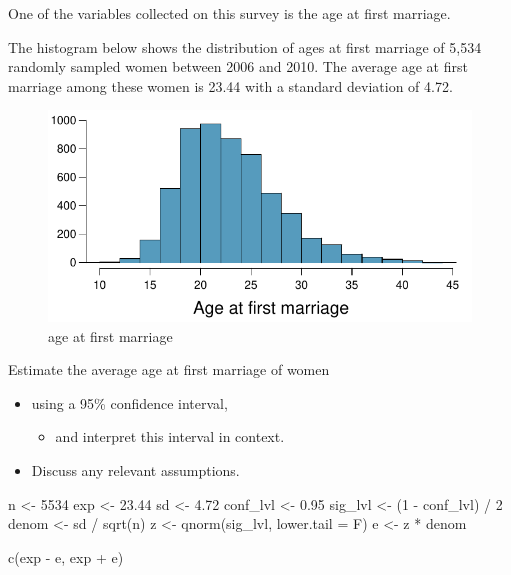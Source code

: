 \documentclass[
]{article}
\newenvironment{Shaded}{\begin{snugshade}}{\end{snugshade}}
\newcommand{\AttributeTok}[1]{\textcolor[rgb]{0.77,0.63,0.00}{#1}}
\newcommand{\DecValTok}[1]{\textcolor[rgb]{0.00,0.00,0.81}{#1}}
\newcommand{\FloatTok}[1]{\textcolor[rgb]{0.00,0.00,0.81}{#1}}
\newcommand{\FunctionTok}[1]{\textcolor[rgb]{0.00,0.00,0.00}{#1}}
\newcommand{\NormalTok}[1]{#1}
\newcommand{\OtherTok}[1]{\textcolor[rgb]{0.56,0.35,0.01}{#1}}
\newcommand{\SpecialCharTok}[1]{\textcolor[rgb]{0.00,0.00,0.00}{#1}}
\providecommand{\tightlist}{%
  \setlength{\itemsep}{0pt}\setlength{\parskip}{0pt}}
\begin{document}
One of the variables collected on this survey is the age at first
marriage.

The histogram below shows the distribution of ages at first marriage of
5,534 randomly sampled women between 2006 and 2010. The average age at
first marriage among these women is 23.44 with a standard deviation of
4.72.

\begin{figure}
\centering
\includegraphics{./figs/marriage.png}
\caption{age at first marriage}
\end{figure}

Estimate the average age at first marriage of women

\begin{itemize}
\tightlist
\item
  using a 95\% confidence interval,

  \begin{itemize}
  \tightlist
  \item
    and interpret this interval in context.
  \end{itemize}
\item
  Discuss any relevant assumptions.
\end{itemize}

\begin{Shaded}
\begin{Highlighting}[]
\NormalTok{n }\OtherTok{\textless{}{-}} \DecValTok{5534}
\NormalTok{exp }\OtherTok{\textless{}{-}} \FloatTok{23.44}
\NormalTok{sd }\OtherTok{\textless{}{-}} \FloatTok{4.72}
\NormalTok{conf\_lvl }\OtherTok{\textless{}{-}} \FloatTok{0.95}
\NormalTok{sig\_lvl }\OtherTok{\textless{}{-}}\NormalTok{ (}\DecValTok{1} \SpecialCharTok{{-}}\NormalTok{ conf\_lvl) }\SpecialCharTok{/} \DecValTok{2}
\NormalTok{denom  }\OtherTok{\textless{}{-}}\NormalTok{ sd }\SpecialCharTok{/} \FunctionTok{sqrt}\NormalTok{(n)}
\NormalTok{z }\OtherTok{\textless{}{-}} \FunctionTok{qnorm}\NormalTok{(sig\_lvl, }\AttributeTok{lower.tail =}\NormalTok{ F)}
\NormalTok{e }\OtherTok{\textless{}{-}}\NormalTok{ z }\SpecialCharTok{*}\NormalTok{ denom}

\FunctionTok{c}\NormalTok{(exp }\SpecialCharTok{{-}}\NormalTok{ e, exp }\SpecialCharTok{+}\NormalTok{ e)}
\end{Highlighting}
\end{Shaded}
\end{document}
